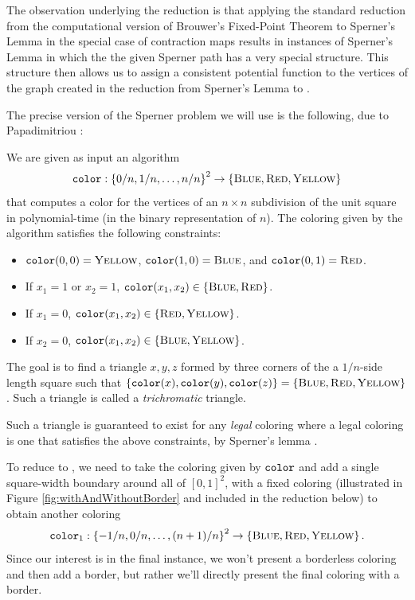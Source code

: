 The observation underlying the reduction is that applying the standard reduction from the computational version of Brouwer's Fixed-Point Theorem to Sperner's Lemma in the special case of contraction maps results in instances of Sperner's Lemma in which the the given Sperner path has a very special structure. This structure then allows us to assign a consistent potential function to the vertices of the \PPAD graph created in the reduction from Sperner's Lemma to \EOL.

The precise version of the Sperner problem we will use is the following, due to Papadimitriou \cite{papadimitriou1994complexity}:
\begin{definition}[\Sperner] 
  \label{def:Sperner}
  We are given as input an algorithm
  \[\operatorname{\texttt{color}}: \left\{ 0/n,1/n,\dotsc,n/n \right\}^2 \to \left\{ \textsc{Blue}, \textsc{Red}, \textsc{Yellow} \right\}\] that computes a color for the vertices of an $n\times n$ subdivision of the unit square in polynomial-time (in the binary representation of $n$). The coloring given by the algorithm satisfies the following constraints:
  \begin{itemize}
  \item $\operatorname{\texttt{color}}(0, 0) = \textsc{Yellow}$, $\operatorname{\texttt{color}}(1, 0) = \textsc{Blue}$, and $\operatorname{\texttt{color}}(0, 1) = \textsc{Red}$.
  \item If $x_1 = 1$ or $x_2 = 1$, $\operatorname{\texttt{color}}(x_1,x_2) \in \left\{ \textsc{Blue}, \textsc{Red} \right\}$.
  \item If $x_1 = 0$, $\operatorname{\texttt{color}}(x_1,x_2) \in \left\{ \textsc{Red}, \textsc{Yellow} \right\}$.
  \item If $x_2 = 0$, $\operatorname{\texttt{color}}(x_1,x_2) \in \left\{ \textsc{Blue}, \textsc{Yellow} \right\}$.
  \end{itemize}

  The goal is to find a triangle $x,y,z$ formed by three corners of the a $1/n$-side length square such that $\left\{ \operatorname{\texttt{color}}(x),\operatorname{\texttt{color}}(y),\operatorname{\texttt{color}}(z) \right\} = \left\{ \textsc{Blue},\textsc{Red},\textsc{Yellow} \right\}$. Such a triangle is called a \emph{trichromatic} triangle.
\end{definition}

Such a triangle is guaranteed to exist for any \emph{legal} coloring where a legal coloring is one that satisfies the above constraints, by Sperner's lemma \cite{papadimitriou1994complexity}.

To reduce \Sperner to \EOL, we need to take the coloring given by $\operatorname{\texttt{color}}$ and add a single square-width boundary around all of $[0,1]^2$, with a fixed coloring (illustrated in Figure \ref{fig:withAndWithoutBorder} and included in the reduction below) to obtain another coloring \[\operatorname{\texttt{color}}_1 : \left\{ -1/n,0/n,\dotsc,(n+1)/n \right\}^2 \to \left\{ \textsc{Blue}, \textsc{Red}, \textsc{Yellow} \right\}\text{.}\]  Since our interest is in the final \EOPL instance, we won't present a borderless coloring and then add a border, but rather we'll directly present the final coloring with a border.

